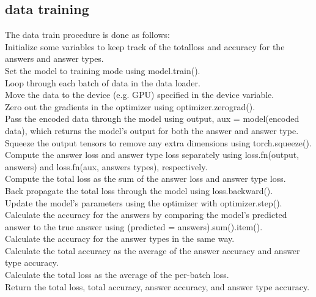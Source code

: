 \documentclass{report}
\begin{document}
\subsection{data training}
The data train procedure is done as follows:\\
Initialize some variables to keep track of the totalloss and accuracy for the answers and answer types.\\
Set the model to training mode using model.train().\\
Loop through each batch of data in the data loader.\\
Move the data to the device (e.g. GPU) specified in the device variable.\\
Zero out the gradients in the optimizer using optimizer.zerograd().\\
Pass the encoded data through the model using output, aux = model(encoded data), which returns the model's output for both the answer and answer type.\\
Squeeze the output tensors to remove any extra dimensions using torch.squeeze().\\
Compute the answer loss and answer type loss separately using loss.fn(output, answers) and loss.fn(aux, answers types), respectively.\\
Compute the total loss as the sum of the answer loss and answer type loss.\\
Back propagate the total loss through the model using loss.backward().\\
Update the model's parameters using the optimizer with optimizer.step().\\
Calculate the accuracy for the answers by comparing the model's predicted answer to the true answer using (predicted = answers).sum().item().\\
Calculate the accuracy for the answer types in the same way.\\
Calculate the total accuracy as the average of the answer accuracy and answer type accuracy.\\
Calculate the total loss as the average of the per-batch loss.\\
Return the total loss, total accuracy, answer accuracy, and answer type accuracy.\\
\end{document}

